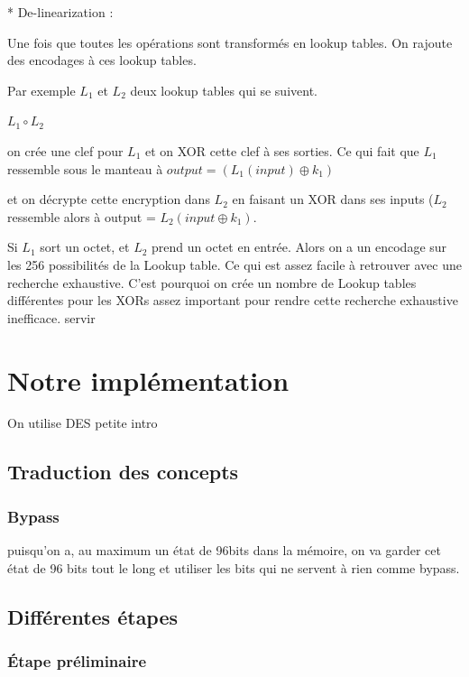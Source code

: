 \documentclass[a4paper,12pt]{article}
\begin{document}
* De-linearization :

Une fois que toutes les opérations sont transformés en lookup tables. On rajoute des encodages à ces lookup tables.

Par exemple $L_1$ et $L_2$ deux lookup tables qui se suivent.

$L_1 \circ L_2$

on crée une clef pour $L_1$ et on XOR cette clef à ses sorties. Ce qui fait que $L_1$ ressemble sous le manteau à $output = (L_1(input) \oplus k_1)$

et on décrypte cette encryption dans $L_2$ en faisant un XOR dans ses inputs ($L_2$ ressemble alors à output = $L_2(input \oplus k_1).$

Si $L_1$ sort un octet, et $L_2$ prend un octet en entrée. Alors on a un encodage sur les 256 possibilités de la Lookup table. Ce qui est assez facile à retrouver avec une recherche exhaustive. C'est pourquoi on crée un nombre de Lookup tables différentes pour les XORs assez important pour rendre cette recherche exhaustive inefficace. servir

\newpage

\section{Notre implémentation}

On utilise DES
petite intro

\subsection{Traduction des concepts}

\subsubsection{Bypass}

puisqu'on a, au maximum un état de 96bits dans la mémoire, on va garder cet état de 96 bits tout le long et utiliser les bits qui ne servent à rien comme bypass.

\subsection{Différentes étapes}

\subsubsection{Étape préliminaire}
\end{document}
